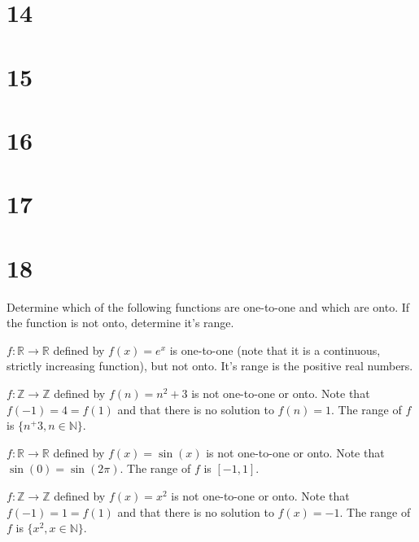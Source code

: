 \documentclass[a4paper]{article}
\begin{document}
\section*{14}


\section*{15}


\section*{16}


\section*{17}


\section*{18}

Determine which of the following functions are one-to-one and which are onto. If the function is not onto, determine it's range.

\vspace{\baselineskip}

$f : \mathbb{R} \rightarrow \mathbb{R}$ defined by $f(x) = e^x$ is one-to-one (note that it is a continuous, strictly increasing function), but not onto. It's range is the positive real numbers.

\vspace{\baselineskip}

$f : \mathbb{Z} \rightarrow \mathbb{Z}$ defined by $f(n) = n^2 + 3$ is not one-to-one or onto. Note that $f(-1) = 4 = f(1)$ and that there is no solution to $f(n) = 1$. The range of $f$ is $\{ n^ + 3, n \in \mathbb{N} \}$.

\vspace{\baselineskip}

$f : \mathbb{R} \rightarrow \mathbb{R}$ defined by $f(x) = \sin(x)$ is not one-to-one or onto. Note that $\sin(0) = \sin(2\pi)$. The range of $f$ is $[-1, 1]$.

\vspace{\baselineskip}

$f : \mathbb{Z} \rightarrow \mathbb{Z}$ defined by $f(x) = x^2$ is not one-to-one or onto. Note that $f(-1) = 1 = f(1)$ and that there is no solution to $f(x) = -1$. The range of $f$ is $\{ x^2, x \in \mathbb{N}\}$.
\end{document}
